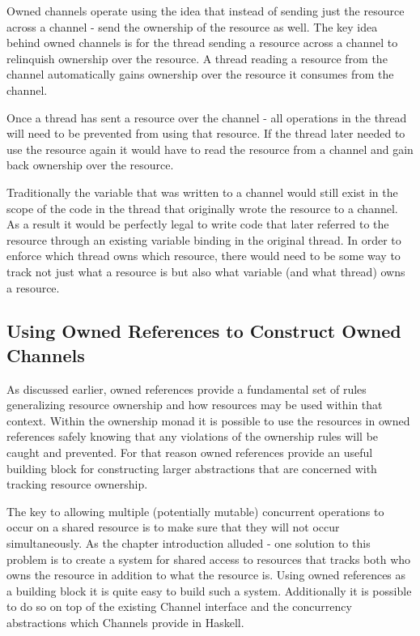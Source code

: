 \documentclass[onehalf,11pt]{beavtex}
\begin{document}

Owned channels operate using the idea that instead of sending just the
resource across a channel - send the ownership of the resource as well.
The key idea behind owned channels is for the thread sending a
resource across a channel to relinquish ownership over the resource.
A thread reading a resource from the channel automatically gains ownership over
the resource it consumes from the channel.

Once a thread has sent a resource over the channel - all operations in the thread
will need to be prevented from using that resource.
If the thread later needed to use the resource again it would have to read the
resource from a channel and gain back ownership over the resource.

Traditionally the variable that was written to a channel would still exist in the
scope of the code in the thread that originally wrote the resource to a channel.
As a result it would be perfectly legal to write code that later referred to the
resource through an existing variable binding in the original thread.
In order to enforce which thread owns which resource, there would need to be
some way to track not just what a resource is but also what variable (and what
thread) owns a resource.

\subsection{Using Owned References to Construct Owned Channels}

As discussed earlier, owned references provide a fundamental set of
rules generalizing resource ownership and how resources may be used within that
context.  Within the ownership monad it is possible to use the
resources in owned references safely knowing that any violations of
the ownership rules will be caught and prevented.  For that reason
owned references provide an useful building block for constructing
larger abstractions that are concerned with tracking resource ownership.

The key to allowing multiple (potentially mutable) concurrent operations to occur
on a shared resource is to make sure that they will not occur simultaneously.
As the chapter introduction alluded - one solution to this problem is to
create a system for shared access to resources that tracks both who owns the
resource in addition to what the resource is.
Using owned references as a building block it is quite easy to build
such a system. Additionally it is possible to do so on top of the existing
Channel interface and the concurrency abstractions which Channels provide in
Haskell.
\end{document}
